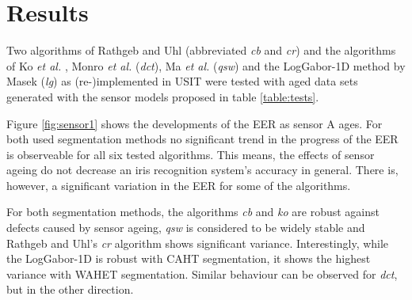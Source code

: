 \documentclass[10pt,twocolumn,letterpaper]{article}
\providecommand{\etal}[0]{\textit{et al.} }
\begin{document}
 \section{Results}
 \label{results}
 Two algorithms of Rathgeb and Uhl (abbreviated \emph{cb} and \emph{cr}) 
 and the algorithms of Ko \etal,
Monro \etal (\emph{dct}),
 Ma \etal(\emph{qsw})
  and the LogGabor-1D method by Masek (\emph{lg}) as (re-)implemented in USIT were tested with aged data sets generated with the sensor models proposed in table \ref{table:tests}.
 
 Figure \ref{fig:sensor1} shows the developments of the EER as sensor A ages. For both used segmentation methods no significant trend in the progress of the EER is observeable for all six tested algorithms. This means, the effects of sensor ageing do not decrease an iris recognition system's accuracy in general. There is, however, a significant variation in the EER for some of the algorithms. 
  
For both segmentation methods, the algorithms \emph{cb} and \emph{ko} are robust against defects caused by sensor ageing, \emph{qsw} is considered to be widely stable and Rathgeb and Uhl's \emph{cr} algorithm shows significant variance. Interestingly, while the LogGabor-1D is robust with CAHT segmentation, it shows the highest variance with WAHET segmentation. Similar behaviour can be observed for \emph{dct}, but in the other direction.
\end{document}
